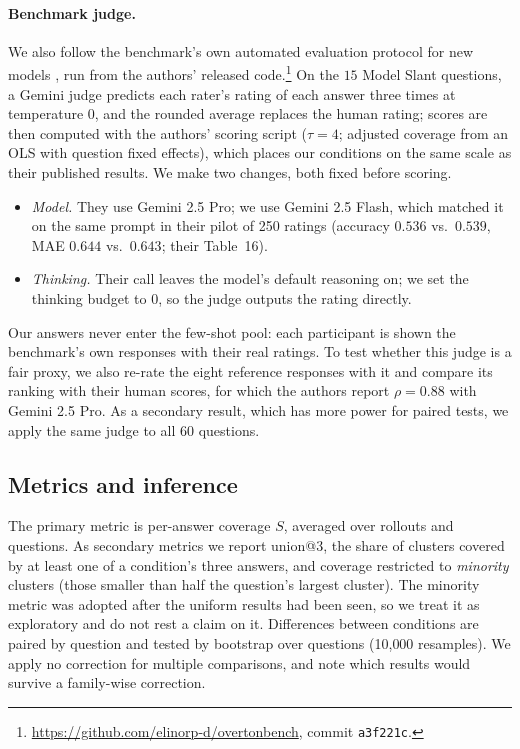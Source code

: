 \documentclass[11pt]{article}
\begin{document}
\paragraph{Benchmark judge.} We also follow the benchmark's own automated
evaluation protocol for new models \citep[App.~C]{placeholder-overtonbench},
run from the authors' released
code.\footnote{\url{https://github.com/elinorp-d/overtonbench}, commit
\texttt{a3f221c}.} On the $15$ Model Slant questions, a Gemini judge predicts
each rater's rating of each answer three times at temperature $0$, and the
rounded average replaces the human rating; scores are then computed with the
authors' scoring script ($\tau = 4$; adjusted coverage from an OLS with question
fixed effects), which places our conditions on the same scale as their published
results. We make two changes, both fixed before scoring.
\begin{itemize}
  \item \emph{Model.} They use Gemini 2.5 Pro; we use Gemini 2.5 Flash, which
  matched it on the same prompt in their pilot of 250 ratings (accuracy $0.536$
  vs.\ $0.539$, MAE $0.644$ vs.\ $0.643$; their Table~16).
  \item \emph{Thinking.} Their call leaves the model's default reasoning on; we
  set the thinking budget to $0$, so the judge outputs the rating directly.
\end{itemize}
Our answers never enter the few-shot pool: each participant is shown the
benchmark's own responses with their real ratings. To test whether this judge
is a fair proxy, we also re-rate the eight reference responses with it and
compare its ranking with their human scores, for which the authors report
$\rho = 0.88$ with Gemini 2.5 Pro. As a secondary result, which has more power
for paired tests, we apply the same judge to all $60$ questions.

\subsection{Metrics and inference}
The primary metric is per-answer coverage $S$, averaged over rollouts and
questions. As secondary metrics we report union@3, the share of clusters
covered by at least one of a condition's three answers, and coverage restricted
to \emph{minority} clusters (those smaller than half the question's largest
cluster). The minority metric was adopted after the uniform results had been
seen, so we treat it as exploratory and do not rest a claim on it. Differences
between conditions are paired by question and tested by bootstrap over
questions (10{,}000 resamples). We apply no correction for multiple
comparisons, and note which results would survive a family-wise correction.
\end{document}
